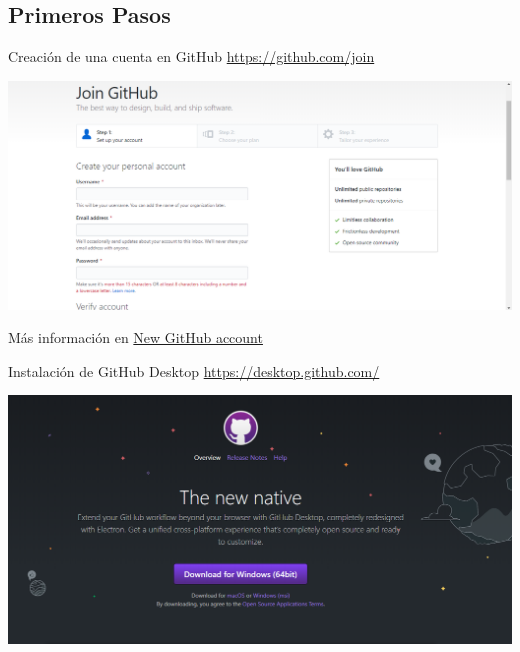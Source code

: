\documentclass[aspectratio=169, xcolor={usenames,svgnames,dvipsnames}]{beamer}
\begin{document}
\subsection{Primeros Pasos}
\label{sec:orgd2405fc}
\begin{frame}[label={sec:org8ee27b2}]{Creación de una cuenta en GitHub}
\url{https://github.com/join}

\begin{center}
\includegraphics[width=.9\linewidth]{figs/GitHub_Join.png}
\end{center}

Más información en \href{https://help.github.com/articles/signing-up-for-a-new-github-account/}{New GitHub account}
\end{frame}

\begin{frame}[label={sec:org14494f3}]{Instalación de GitHub Desktop}
\url{https://desktop.github.com/}

\begin{center}
\includegraphics[width=.9\linewidth]{figs/GitHub_Desktop.png}
\end{center}
\end{frame}
\end{document}
